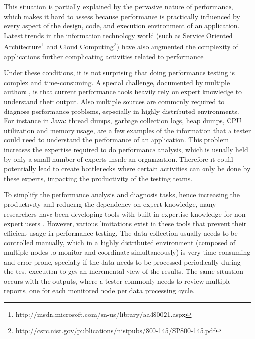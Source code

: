 \documentclass[runningheads,a4paper]{llncs}
\begin{document}
This situation is partially explained by the pervasive nature of
performance, which makes it hard to assess because performance is practically
influenced by every aspect of the design, code, and execution environment
of an application. Latest trends in the information technology world (such as
Service Oriented
Architecture\footnote{http://msdn.microsoft.com/en-us/library/aa480021.aspx} and Cloud Computing\footnote{http://csrc.nist.gov/publications/nistpubs/800-145/SP800-145.pdf}) 
have also augmented the complexity of applications further complicating activities related to
performance. 

Under these conditions, it is not surprising that doing performance
testing is complex and time-consuming. A special challenge, documented by
multiple authors \cite{Woodside2007,trevor1,Angelopoulos2012}, is that current
performance tools heavily rely on expert knowledge to understand their output.
Also multiple sources are commonly required to diagnose performance problems,
especially in highly distributed environments. For instance in Java: thread dumps, 
garbage collection logs, heap dumps, CPU utilization and memory usage, are a few
examples of the information that a tester could need to understand the performance 
of an application. This problem increases the expertise required to do
performance analysis, which is usually held by only a small number of experts inside an
organization\cite{Spear2009}. Therefore it could potentially lead to
create bottlenecks where certain activities can only be done by these experts,
impacting the productivity of the testing teams\cite{Angelopoulos2012}.

To simplify the performance analysis and diagnosis tasks, hence increasing the
productivity and reducing the dependency on expert knowledge, many researchers
have been developing tools with built-in expertise knowledge for non-expert
users \cite{Altman2010,pat7,Angelopoulos2012}. However, various limitations
exist in these tools that prevent their efficient usage in performance testing.
The data collection usually needs to be controlled manually, which in
a highly distributed environment (composed of multiple nodes to monitor and
coordinate simultaneously) is very time-consuming and error-prone, specially if
the data needs to be processed periodically during the test execution to get an
incremental view of the results. The same situation occurs with the outputs,
where a tester commonly needs to review multiple reports, one for each monitored
node per data processing cycle.
\end{document}
